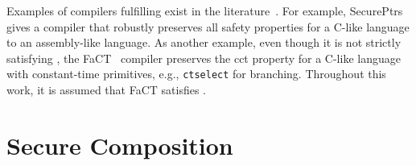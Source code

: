 \documentclass[dvipsnames,conference]{IEEEtran}
\theoremstyle{definition}
\begin{document}
Examples of compilers fulfilling  exist in the literature~\cite{korashy2022secureptrs,korashy2021capableptrs,abate2021extacc,abate2019jour,patrignani2021rsc}.
For example, SecurePtrs~\cite{korashy2022secureptrs} gives a compiler that robustly preserves all safety properties for a C-like language to an assembly-like language. 
As another example, even though it is not strictly satisfying , the FaCT~\cite{cauligi2019fact} compiler preserves the \gls*{cct} property for a C-like language with constant-time primitives, e.g., \texttt{ctselect} for branching. %
Throughout this work, it is assumed that FaCT satisfies .


\section{Secure Composition}\label{sec:sequential}
\end{document}
